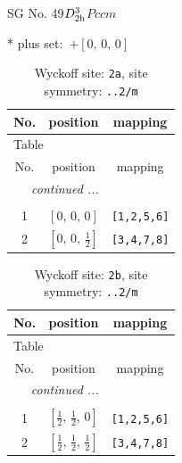 \documentclass[fleqn,8pt]{jsarticle}
\begin{document}
\setcounter{MaxMatrixCols}{32}

\renewcommand{\tablename}{Table~}
\renewcommand{\figurename}{Figure~}
\begin{center}
\LARGE
SG No. 49\quad$D_{\rm 2h}^{3}$\quad$Pccm$\quad[ orthorhombic ]
\end{center}
* plus set:\,\,\,$+\left[ 0,\, 0,\, 0 \right]$
\renewcommand{\arraystretch}{1.2}
\begin{longtable}{ccc}
\caption{Wyckoff site: {\tt 2a}, site symmetry: {\tt ..2/m}}
 \\
 \hline \hline
No. & position & mapping \\ \hline \endfirsthead

\multicolumn{2}{l}{\tablename\ \thetable{}} \\
 \hline \hline
No. & position & mapping \\ \hline \endhead

 \hline \hline
\multicolumn{2}{r}{\footnotesize\it continued ...} \\ \endfoot

 \hline \hline
\multicolumn{2}{r}{} \\ \endlastfoot

1 & $\left[ 0,\, 0,\, 0 \right]$ & {\tt [1,2,5,6]} \\ \hline
2 & $\left[ 0,\, 0,\, \frac{1}{2} \right]$ & {\tt [3,4,7,8]} \\
\end{longtable}
\renewcommand{\arraystretch}{1.2}
\begin{longtable}{ccc}
\caption{Wyckoff site: {\tt 2b}, site symmetry: {\tt ..2/m}}
 \\
 \hline \hline
No. & position & mapping \\ \hline \endfirsthead

\multicolumn{2}{l}{\tablename\ \thetable{}} \\
 \hline \hline
No. & position & mapping \\ \hline \endhead

 \hline \hline
\multicolumn{2}{r}{\footnotesize\it continued ...} \\ \endfoot

 \hline \hline
\multicolumn{2}{r}{} \\ \endlastfoot

1 & $\left[ \frac{1}{2},\, \frac{1}{2},\, 0 \right]$ & {\tt [1,2,5,6]} \\ \hline
2 & $\left[ \frac{1}{2},\, \frac{1}{2},\, \frac{1}{2} \right]$ & {\tt [3,4,7,8]} \\
\end{longtable}
\end{document}
